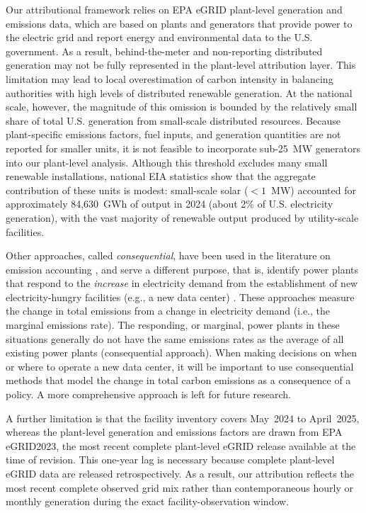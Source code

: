 \documentclass[12pt]{article}
\begin{document}
Our attributional framework relies on EPA eGRID plant-level generation and emissions data, which are based on plants and generators that provide power to the electric grid and report energy and environmental data to the U.S. government. As a result, behind-the-meter and non-reporting distributed generation may not be fully represented in the plant-level attribution layer. This limitation may lead to local overestimation of carbon intensity in balancing authorities with high levels of distributed renewable generation. At the national scale, however, the magnitude of this omission is bounded by the relatively small share of total U.S. generation from small-scale distributed resources. Because plant-specific emissions factors, fuel inputs, and generation quantities are not reported for smaller units, it is not feasible to incorporate sub-25~MW generators into our plant-level analysis. Although this threshold excludes many small renewable installations, national EIA statistics show that the aggregate contribution of these units is modest: small-scale solar ($<1$~MW) accounted for approximately 84,630~GWh of output in 2024 (about 2\% of U.S. electricity generation), with the vast majority of renewable output produced by utility-scale facilities.\cite{eia_electric_power_monthly_2024_smallscale,eia_utility_smallscale_solar_2023}

Other approaches, called \textit{consequential},  have been used in the literature on emission accounting \cite{xing2023carbonrespondercoordinatingdemand,jagannadharao2023timeshifting,dodge2022measuringcarbonintensityai, guidi2025environmental}, and serve a different purpose, that is, identify power plants that respond to the \textit{increase} in electricity demand from the establishment of new electricity-hungry facilities (e.g., a new data center) \cite{Gagnon_and_Cole2022}.  These approaches measure the change in total emissions from a change in electricity demand \cite{brander_most_2022} (i.e., the marginal emissions rate).  The responding, or marginal, power plants in these situations generally do not have the same emissions rates as the average of all existing power plants (consequential approach).   When making decisions on when or where to operate a new data center, it will be important to use consequential methods that model the change in total carbon emissions as a consequence of a policy. A more comprehensive approach is left for future research.

A further limitation is that the facility inventory covers May~2024 to April~2025, whereas the plant-level generation and emissions factors are drawn from EPA eGRID2023, the most recent complete plant-level eGRID release available at the time of revision. This one-year lag is necessary because complete plant-level eGRID data are released retrospectively. As a result, our attribution reflects the most recent complete observed grid mix rather than contemporaneous hourly or monthly generation during the exact facility-observation window.
\end{document}
